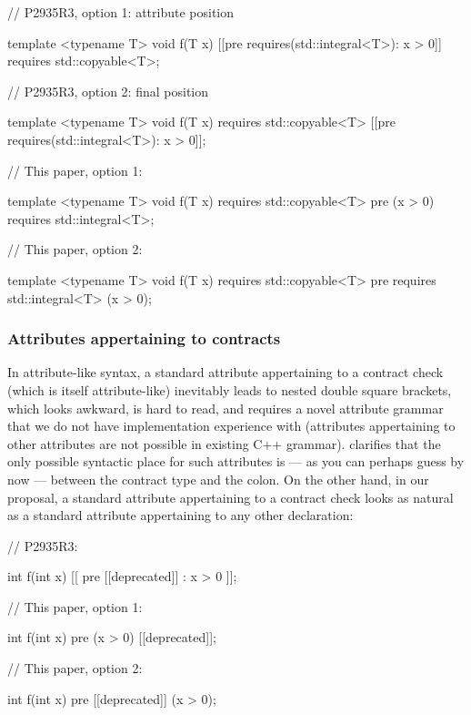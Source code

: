 \begin{minipage}[t]{8.7cm}
\begin{codeblock}
// P2935R3, option 1: attribute position

template <typename T>
void f(T x)
  [[pre requires(std::integral<T>): x > 0]]
  requires std::copyable<T>;
    
// P2935R3, option 2: final position

template <typename T>
void f(T x)
  requires std::copyable<T>
  [[pre requires(std::integral<T>): x > 0]];
\end{codeblock}
\end{minipage}
\begin{minipage}[t]{8cm}
\begin{codeblock}
// This paper, option 1:

template <typename T>
void f(T x)
  requires std::copyable<T>
  pre (x > 0) requires std::integral<T>;
    
// This paper, option 2:

template <typename T>
void f(T x)
  requires std::copyable<T>
  pre requires std::integral<T> (x > 0);
\end{codeblock}
\end{minipage}

\subsubsection{Attributes appertaining to contracts}

In attribute-like syntax, a standard attribute appertaining to a contract check (which is itself attribute-like) inevitably leads to nested double square brackets, which looks awkward, is hard to read, and requires a novel attribute grammar that we do not have implementation experience with (attributes appertaining to other attributes are not possible in existing C++ grammar).  \cite{P2935R3} clarifies that the only possible syntactic place for such attributes is --- as you can perhaps guess by now --- between the contract type and the colon. On the other hand, in our proposal, a standard attribute appertaining to a contract check looks as natural as a standard attribute appertaining to any other declaration:

\begin{minipage}[t]{8cm}
\begin{codeblock}
// P2935R3:

int f(int x) 
  [[ pre [[deprecated]] : x > 0 ]];
\end{codeblock}
\end{minipage}
\begin{minipage}[t]{8cm}
\begin{codeblock}
// This paper, option 1:

int f(int x) 
  pre (x > 0) [[deprecated]];
  
// This paper, option 2:

int f(int x) 
  pre [[deprecated]] (x > 0);
\end{codeblock}
\end{minipage}
\vspace{5mm}

